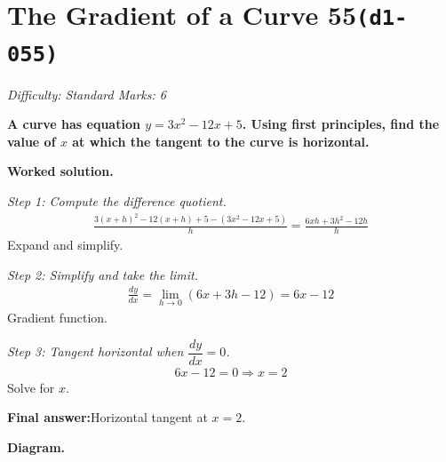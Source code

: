 \documentclass[11pt]{article}
\newcommand{\question}[1]{\par\medskip\noindent\textbf{#1}\par}
\begin{document}
\section*{The Gradient of a Curve 55\quad\small\texttt{(d1-055)}}
\textit{Difficulty: Standard \quad\textbar\quad Marks: 6}

\question{A curve has equation \( y = 3x^2 - 12x + 5 \). Using first principles, find the value of \( x \) at which the tangent to the curve is horizontal.}

\textbf{Worked solution.}

\textit{Step 1: Compute the difference quotient.}
\[\begin{gathered}
\frac{3(x+h)^2 - 12(x+h) + 5 - (3x^2 - 12x + 5)}{h} = \frac{6xh + 3h^2 - 12h}{h}
\end{gathered}\]
Expand and simplify.

\textit{Step 2: Simplify and take the limit.}
\[\begin{gathered}
\frac{dy}{dx} = \lim_{h \to 0}(6x + 3h - 12) = 6x - 12
\end{gathered}\]
Gradient function.

\textit{Step 3: Tangent horizontal when \( \dfrac{dy}{dx} = 0 \).}
\[\begin{gathered}
6x - 12 = 0 \Rightarrow x = 2
\end{gathered}\]
Solve for \( x \).

\begin{answerbox}
\textbf{Final answer:}\quad Horizontal tangent at \(\displaystyle  x = 2 \).
\end{answerbox}
\textbf{Diagram.}
\end{document}
